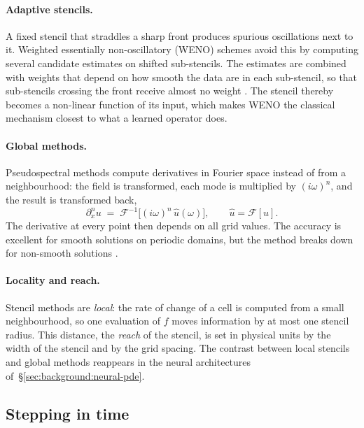 \paragraph{Adaptive stencils.}
A fixed stencil that straddles a sharp front produces spurious
oscillations next to it. Weighted essentially non-oscillatory (WENO)
schemes avoid this by computing several candidate estimates on shifted
sub-stencils. The estimates are combined with weights that depend on how
smooth the data are in each sub-stencil, so that sub-stencils crossing
the front receive almost no weight \citep{Liu1994, JiangShu1996}. The
stencil thereby becomes a non-linear function of its input, which makes
WENO the classical mechanism closest to what a learned operator does.

\paragraph{Global methods.}
Pseudospectral methods compute derivatives in Fourier space instead of from a neighbourhood: the
field is transformed, each mode is multiplied by $(i\omega)^n$, and the
result is transformed back,
\begin{equation*}
  \partial_x^n u \;=\; \mathcal{F}^{-1}\big[(i\omega)^n\, \hat u(\omega)\big],
  \qquad \hat u = \mathcal{F}[u].
\end{equation*}
The derivative at every point then depends
on all grid values. The accuracy is excellent for smooth solutions on
periodic domains, but the method breaks down for non-smooth solutions
\citep{GottliebOrszag1977, Trefethen2000}.

\paragraph{Locality and reach.}
Stencil methods are \emph{local}: the rate of change of a cell is
computed from a small neighbourhood, so one evaluation of $f$ moves
information by at most one stencil radius. This distance, the
\emph{reach} of the stencil, is set in physical units by the width of the
stencil and by the grid spacing. The
contrast between local stencils and global methods reappears in the
neural architectures of~\S\ref{sec:background:neural-pde}.

\subsection{Stepping in time}
\label{sec:background:pde-solvers:time}

